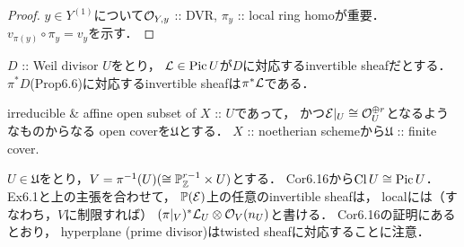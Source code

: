 \documentclass[a4paper]{jsarticle}
\newcommand{\coverU}{\mathfrak{U}}
\newcommand{\Cl}{\operatorname{Cl}}
\newcommand{\Pic}{\operatorname{Pic}}
\newcommand{\pbundle}{\mathbb{P}}
\begin{document}
\begin{proof}
        $y \in Y^{(1)}$について$\mathcal{O}_{Y,y}$ :: DVR, $\pi_y$ :: local ring homoが重要．
        $v_{\pi(y)} \circ \pi_y=v_{y}$を示す．
    \end{proof}

    \begin{Cor}
        $D$ :: Weil divisor $U$をとり，
        $\shL \in \Pic U$が$D$に対応するinvertible sheafだとする．
        $\pi^* D$(Prop6.6)に対応するinvertible sheafは$\pi^* \mathcal{L}$である．
    \end{Cor}

    irreducible \& affine open subset of $X$ :: $U$であって，
    かつ$\mathcal{E}|_U \cong \mathcal{O}_U^{\oplus r}$となるようなものからなる
    open coverを$\coverU$とする．
    $X$ :: noetherian schemeから$\coverU$ :: finite cover.

    $U \in \coverU$をとり，$V=\pi^{-1}(U) (\cong \mathbb{P}^{r-1}_{\mathbb{Z}} \times U)$とする．
    Cor6.16から$\Cl U \iso \Pic U$．
    Ex6.1と上の主張を合わせて，
    $\pbundle(\shE)$上の任意のinvertible sheafは，
    localには（すなわち，$V$に制限すれば）
    $(\pi|_V)^* \mathcal{L}_U \otimes \mathcal{O}_V(n_U)$と書ける．
    Cor6.16の証明にあるとおり，
    hyperplane (prime divisor)はtwisted sheafに対応することに注意．
\end{document}
